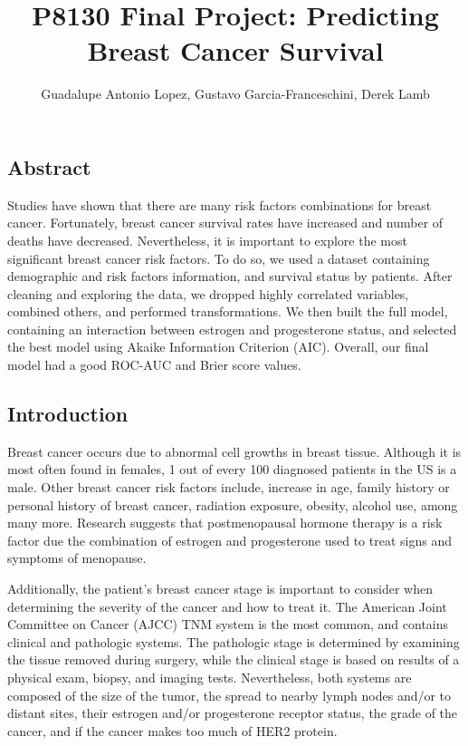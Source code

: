 \documentclass[]{article}
\title{P8130 Final Project: Predicting Breast Cancer Survival}
\author{Guadalupe Antonio Lopez, Gustavo Garcia-Franceschini, Derek Lamb}
\date{}
\begin{document}
\maketitle

\hypertarget{abstract}{%
\subsection{Abstract}\label{abstract}}

Studies have shown that there are many risk factors combinations for
breast cancer. Fortunately, breast cancer survival rates have increased
and number of deaths have decreased. Nevertheless, it is important to
explore the most significant breast cancer risk factors. To do so, we
used a dataset containing demographic and risk factors information, and
survival status by patients. After cleaning and exploring the data, we
dropped highly correlated variables, combined others, and performed
transformations. We then built the full model, containing an interaction
between estrogen and progesterone status, and selected the best model
using Akaike Information Criterion (AIC). Overall, our final model had a
good ROC-AUC and Brier score values.

\hypertarget{introduction}{%
\subsection{Introduction}\label{introduction}}

Breast cancer occurs due to abnormal cell growths in breast tissue.
Although it is most often found in females, 1 out of every 100 diagnosed
patients in the US is a male. Other breast cancer risk factors include,
increase in age, family history or personal history of breast cancer,
radiation exposure, obesity, alcohol use, among many more. Research
suggests that postmenopausal hormone therapy is a risk factor due the
combination of estrogen and progesterone used to treat signs and
symptoms of menopause.

Additionally, the patient's breast cancer stage is important to consider
when determining the severity of the cancer and how to treat it. The
American Joint Committee on Cancer (AJCC) TNM system is the most common,
and contains clinical and pathologic systems. The pathologic stage is
determined by examining the tissue removed during surgery, while the
clinical stage is based on results of a physical exam, biopsy, and
imaging tests. Nevertheless, both systems are composed of the size of
the tumor, the spread to nearby lymph nodes and/or to distant sites,
their estrogen and/or progesterone receptor status, the grade of the
cancer, and if the cancer makes too much of HER2 protein.
\end{document}
